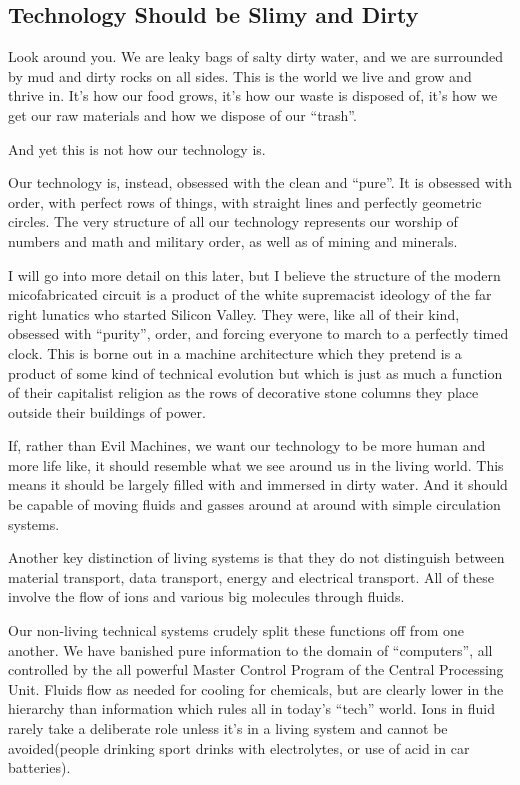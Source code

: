 \subsection{Technology Should be Slimy and
Dirty}\label{technology-should-be-slimy-and-dirty}

Look around you. We are leaky bags of salty dirty water, and we are
surrounded by mud and dirty rocks on all sides. This is the world we
live and grow and thrive in. It's how our food grows, it's how our waste
is disposed of, it's how we get our raw materials and how we dispose of
our ``trash''.

And yet this is not how our technology is.

Our technology is, instead, obsessed with the clean and ``pure''. It is
obsessed with order, with perfect rows of things, with straight lines
and perfectly geometric circles. The very structure of all our
technology represents our worship of numbers and math and military
order, as well as of mining and minerals.

I will go into more detail on this later, but I believe the structure of
the modern micofabricated circuit is a product of the white supremacist
ideology of the far right lunatics who started Silicon Valley. They
were, like all of their kind, obsessed with ``purity'', order, and
forcing everyone to march to a perfectly timed clock. This is borne out
in a machine architecture which they pretend is a product of some kind
of technical evolution but which is just as much a function of their
capitalist religion as the rows of decorative stone columns they place
outside their buildings of power.

If, rather than Evil Machines, we want our technology to be more human
and more life like, it should resemble what we see around us in the
living world. This means it should be largely filled with and immersed
in dirty water. And it should be capable of moving fluids and gasses
around at around with simple circulation systems.

Another key distinction of living systems is that they do not
distinguish between material transport, data transport, energy and
electrical transport. All of these involve the flow of ions and various
big molecules through fluids.

Our non-living technical systems crudely split these functions off from
one another. We have banished pure information to the domain of
``computers'', all controlled by the all powerful Master Control Program
of the Central Processing Unit. Fluids flow as needed for cooling for
chemicals, but are clearly lower in the hierarchy than information which
rules all in today's ``tech'' world. Ions in fluid rarely take a
deliberate role unless it's in a living system and cannot be
avoided(people drinking sport drinks with electrolytes, or use of acid
in car batteries).

